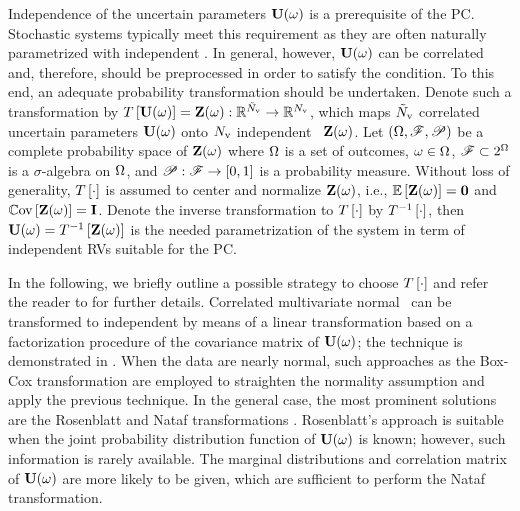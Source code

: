 Independence of the uncertain parameters $\mathbf{U}(\omega)$ is a prerequisite of the PC. Stochastic systems typically meet this requirement as they are often naturally parametrized \cite{xiu2010} with independent \rvs. In general, however, $\mathbf{U}(\omega)$ can be correlated and, therefore, should be preprocessed in order to satisfy the condition. To this end, an adequate probability transformation should be undertaken. Denote such a transformation by $T\left[\mathbf{U}(\omega)\right] = \mathbf{Z}(\omega): \mathbb{R}^{\tilde{N}_\text{v}} \to \mathbb{R}^{N_\text{v}}$, which maps ${\tilde{N}_\text{v}}$ correlated uncertain parameters $\mathbf{U}(\omega)$ onto ${N_\text{v}}$ independent \rvs\ $\mathbf{Z}(\omega)$. Let $(\Omega, \mathscr{F}, \mathscr{P})$ be a complete probability space \cite{durrett2010} of $\mathbf{Z}(\omega)$ where $\Omega$ is a set of outcomes, $\omega \in \Omega$, $\mathscr{F} \subset 2^\Omega$ is a $\sigma$-algebra on $\Omega$, and $\mathscr{P}: \mathscr{F} \to [0, 1]$ is a probability measure. Without loss of generality, $T\left[\cdot\right]$ is assumed to center and normalize $\mathbf{Z}(\omega)$, i.e., $\oExp{\vZ(\o)} = \mZero$ and $\oCov{\vZ(\o)} = \mI$. Denote the inverse transformation to $T\left[\cdot\right]$ by $T^{-1}\left[\cdot\right]$, then $\mathbf{U}(\omega) = T^{-1}\left[\mathbf{Z}(\omega)\right]$ is the needed parametrization of the system in term of independent RVs suitable for the PC.

In the following, we briefly outline a possible strategy to choose $T\left[\cdot\right]$ and refer the reader to \cite{xiu2010, eldred2009} for further details. Correlated multivariate normal \rvs\ can be transformed to independent by means of a linear transformation based on a factorization procedure of the covariance matrix of $\mathbf{U}(\omega)$; the technique is demonstrated in . When the data are nearly normal, such approaches as the Box-Cox transformation are employed to straighten the normality assumption and apply the previous technique. In the general case, the most prominent solutions are the Rosenblatt and Nataf transformations \cite{eldred2009}. Rosenblatt's approach is suitable when the joint probability distribution function of $\mathbf{U}(\omega)$ is known; however, such information is rarely available. The marginal distributions and correlation matrix of $\mathbf{U}(\omega)$ are more likely to be given, which are sufficient to perform the Nataf transformation.
